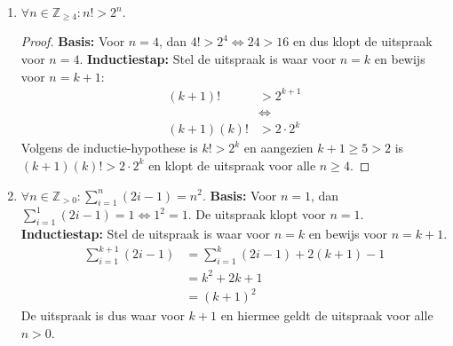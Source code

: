 \documentclass{article}
\begin{document}
\begin{enumerate}[label=\alph*)]
\begin{proof}
        \end{proof}
    \item $\forall n \in \mathbb{Z}_{\geq 4}: n! > 2^n.$
    \begin{proof}
        \textbf{Basis:} Voor $n=4$, dan $4! > 2^4 \Leftrightarrow 24 > 16$ en dus klopt de uitspraak voor $n=4$. 
        \textbf{Inductiestap:} Stel de uitspraak is waar voor $n=k$ en bewijs voor $n=k+1$:
            \begin{align*}
                (k+1)! &> 2^{k+1} \\
                &\Leftrightarrow \\
                (k+1)(k)! &> 2 \cdot 2^k 
            \end{align*}
            Volgens de inductie-hypothese is $k! > 2^k$ en aangezien $k+1\geq 5>2$ is $(k+1)(k)! > 2 \cdot 2^k$ en klopt de uitspraak voor alle $n \geq 4$.
    \end{proof}
    \item $\forall n \in \mathbb{Z}_{>0} : \sum_{i=1}^{n}(2i-1) = n^2$.
    \textbf{Basis:} Voor $n=1$, dan $\sum_{i=1}^{1}(2i-1)=1 \Leftrightarrow 1^2 = 1$. De uitspraak klopt voor $n=1$.
    \textbf{Inductiestap:} Stel de uitspraak is waar voor $n=k$ en bewijs voor $n=k+1$. 
        \begin{align*}
            \sum_{i=1}^{k+1}(2i-1) &= \sum_{i=1}^{k}(2i-1) + 2(k+1)-1 \\
            &= k^2+2k+1 \\
            &= (k+1)^2
        \end{align*}
        De uitspraak is dus waar voor $k+1$ en hiermee geldt de uitspraak voor alle $n>0$.
\end{enumerate}
\subsection{}
\end{document}
